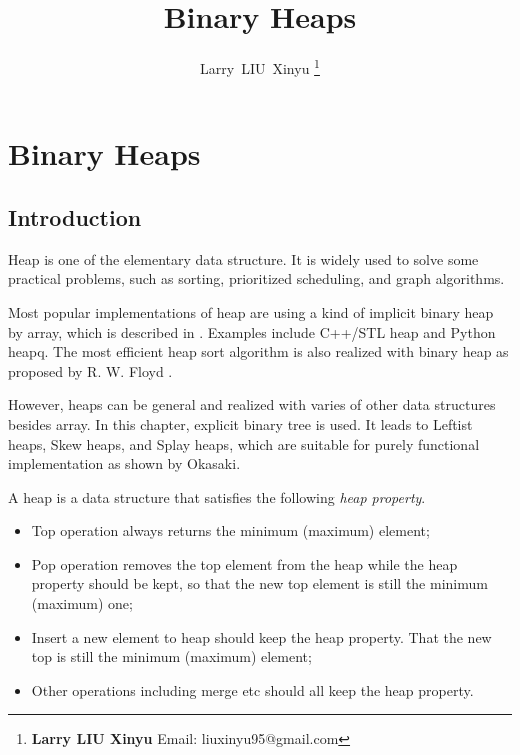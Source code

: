 \documentclass{article}
\begin{document}
\fi


\title{Binary Heaps}

\author{Larry~LIU~Xinyu
\thanks{{\bfseries Larry LIU Xinyu } \newline
  Email: liuxinyu95@gmail.com \newline}
  }


\maketitle

\ifx\wholebook\relax
\chapter{Binary Heaps}
\fi

\section{Introduction}
\label{introduction}

Heap is one of the elementary data structure. It is widely used
to solve some practical problems, such as sorting, prioritized
scheduling, and graph algorithms\cite{wiki-heap}.

Most popular implementations of heap are using a kind of implicit
binary heap by array, which is described in \cite{CLRS}.
Examples include C++/STL heap and Python heapq. The most efficient
heap sort algorithm is also
realized with binary heap as proposed by R. W. Floyd
\cite{wiki-heapsort} \cite{rosetta-heapsort}.

However, heaps can be general and realized with varies
of other data structures besides array.
In this chapter, explicit
binary tree is used. It leads to Leftist heaps, Skew heaps,
and Splay heaps, which are suitable for purely functional
implementation as shown
by Okasaki\cite{okasaki-book}.

A heap is a data structure that satisfies the following {\em heap property}.
\begin{itemize}
\item Top operation always returns the minimum (maximum) element;
\item Pop operation removes the top element from the heap while the heap
property should be kept, so that the new top element is still the
minimum (maximum) one;
\item Insert a new element to heap should keep the heap property. That
the new top is still the minimum (maximum) element;
\item Other operations including merge etc should all keep the heap property.
\end{itemize}
\end{document}
